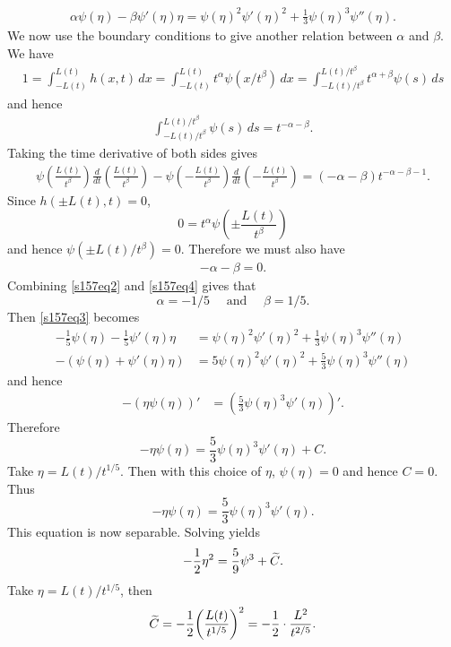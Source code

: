 \begin{align}\label{s157eq3}
\alpha\psi(\eta) - \beta\psi'(\eta)\eta = \psi(\eta)^{2}\psi'(\eta)^{2} + \frac{1}{3}\psi(\eta)^{3}\psi''(\eta).
\end{align}
We now use the boundary conditions to give another relation between $\alpha$ and $\beta$.
We have
\begin{align*}
1 = \int_{-L(t)}^{L(t)}h(x, t)\, dx = \int_{-L(t)}^{L(t)}t^{\alpha}\psi(x/t^{\beta})\, dx = \int_{-L(t)/t^{\beta}}^{L(t)/t^{\beta}}t^{\alpha + \beta}\psi(s)\, ds
\end{align*}
and hence
\begin{align*}
\int_{-L(t)/t^{\beta}}^{L(t)/t^{\beta}}\psi(s)\, ds = t^{-\alpha - \beta}.
\end{align*}
Taking the time derivative of both sides gives
\begin{align*}
\psi(\frac{L(t)}{t^{\beta}})\frac{d}{dt}(\frac{L(t)}{t^{\beta}}) - \psi(-\frac{L(t)}{t^{\beta}})\frac{d}{dt}(-\frac{L(t)}{t^{\beta}}) = (-\alpha - \beta)t^{-\alpha - \beta - 1}.
\end{align*}
Since $h(\pm L(t), t) = 0$,
$$0 = t^{\alpha}\psi(\pm\frac{L(t)}{t^{\beta}})$$
and hence $\psi(\pm L(t)/t^{\beta}) = 0$.
Therefore we must also have
\begin{align}\label{s157eq4}
-\alpha - \beta = 0.
\end{align}
Combining \eqref{s157eq2} and \eqref{s157eq4} gives that
$$\alpha = -1/5 \quad \text{ and } \quad \beta = 1/5.$$
Then \eqref{s157eq3} becomes
\begin{align*}
-\frac{1}{5}\psi(\eta) - \frac{1}{5}\psi'(\eta)\eta &= \psi(\eta)^{2}\psi'(\eta)^{2} + \frac{1}{3}\psi(\eta)^{3}\psi''(\eta)\\
-(\psi(\eta) + \psi'(\eta)\eta) &= 5\psi(\eta)^{2}\psi'(\eta)^{2} + \frac{5}{3}\psi(\eta)^{3}\psi''(\eta)
\end{align*}
and hence
\begin{align*}
-(\eta\psi(\eta))' &= (\frac{5}{3}\psi(\eta)^{3}\psi'(\eta))'.
\end{align*}
Therefore
$$-\eta\psi(\eta) = \frac{5}{3}\psi(\eta)^{3}\psi'(\eta) + C.$$
Take $\eta = L(t)/t^{1/5}$. Then with this choice of $\eta$, $\psi(\eta) = 0$ and hence $C = 0$. Thus
$$-\eta\psi(\eta) = \frac{5}{3}\psi(\eta)^{3}\psi'(\eta).$$
This equation is now separable. Solving yields
\begin{align*}
-\frac{1}{2}\eta^{2} = \frac{5}{9}\psi^{3} + \widetilde{C}.
\end{align*}
Take $\eta = L(t)/t^{1/5}$, then $$\widetilde{C} = -\frac{1}{2}\bigg(\frac{L(t)}{t^{1/5}}\bigg)^{2} = -\frac{1}{2}\cdot \frac{L^{2}}{t^{2/5}}.$$
